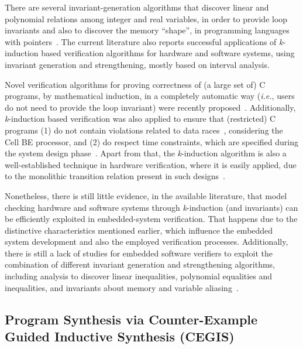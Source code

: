 \documentclass{acm_sen_article}
\begin{document}
There are several invariant-generation algorithms that discover linear and polynomial relations among integer and real variables, in order to provide loop invariants and also to discover the memory ``shape'', in programming languages with pointers~\cite{pips:2013,Henry:2012}. The current literature also reports successful applications of \textit{k}-induction based verification algorithms for hardware and software systems, using invariant generation and strengthening, mostly based on interval analysis. 

Novel verification algorithms for proving correctness of (a large set of) C programs, by mathematical induction, in a completely automatic way ({\it i.e.}, users do not need to provide the loop invariant) were recently proposed~\cite{Gadelha15,Beyer15,Brain15,Rocha15,Kinductor,Rocha17}. Additionally, \textit{k}-induction based verification was also applied to ensure that (restricted) C programs (1) do not contain violations related to data races~\cite{Donaldson10}, considering the Cell BE processor, and (2) do respect time constraints, which are specified during the system design phase~\cite{EenS03}. Apart from that, the \textit{k}-induction algorithm is also a well-established technique in hardware verification, where it is easily applied, due to the monolithic transition relation present in such designs~\cite{EenS03,Sheera00,GrosseLD09}. 

Nonetheless, there is still little evidence, in the available literature, that model checking hardware and software systems through \textit{k}-induction (and invariants) can be efficiently exploited in embedded-system verification. That happens due to the distinctive characteristics mentioned earlier, which influence the embedded system development and also the employed verification processes. Additionally, there is still a lack of studies for embedded software verifiers to exploit the combination of different invariant generation and strengthening algorithms, including analysis to discover linear inequalities, polynomial equalities and inequalities, and invariants about memory and variable aliasing~\cite{Bradley07}.

\subsection{Program Synthesis via Counter-Example \\ Guided Inductive Synthesis (CEGIS)}
\end{document}
